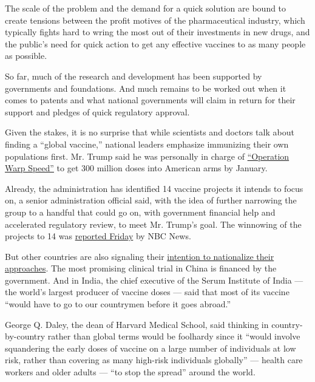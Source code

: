 The scale of the problem and the demand for a quick solution are bound
to create tensions between the profit motives of the pharmaceutical
industry, which typically fights hard to wring the most out of their
investments in new drugs, and the public's need for quick action to get
any effective vaccines to as many people as possible.

So far, much of the research and development has been supported by
governments and foundations. And much remains to be worked out when it
comes to patents and what national governments will claim in return for
their support and pledges of quick regulatory approval.

Given the stakes, it is no surprise that while scientists and doctors
talk about finding a ``global vaccine,'' national leaders emphasize
immunizing their own populations first. Mr. Trump said he was personally
in charge of
\href{https://www.nytimes.com/2020/04/29/us/politics/trump-coronavirus-vaccine-operation-warp-speed.html}{``Operation
Warp Speed''} to get 300 million doses into American arms by January.

Already, the administration has identified 14 vaccine projects it
intends to focus on, a senior administration official said, with the
idea of further narrowing the group to a handful that could go on, with
government financial help and accelerated regulatory review, to meet Mr.
Trump's goal. The winnowing of the projects to 14 was
\href{https://www.nbcnews.com/politics/white-house/health-officials-eyeing-least-one-14-potential-coronavirus-vaccines-fast-n1198326}{reported
Friday} by NBC News.

But other countries are also signaling their
\href{https://www.nytimes.com/2020/04/10/business/coronavirus-vaccine-nationalism.html}{intention
to nationalize their approaches}. The most promising clinical trial in
China is financed by the government. And in India, the chief executive
of the Serum Institute of India --- the world's largest producer of
vaccine doses --- said that most of its vaccine ``would have to go to
our countrymen before it goes abroad.''

George Q. Daley, the dean of Harvard Medical School, said thinking in
country-by-country rather than global terms would be foolhardy since it
``would involve squandering the early doses of vaccine on a large number
of individuals at low risk, rather than covering as many high-risk
individuals globally'' --- health care workers and older adults --- ``to
stop the spread'' around the world.


